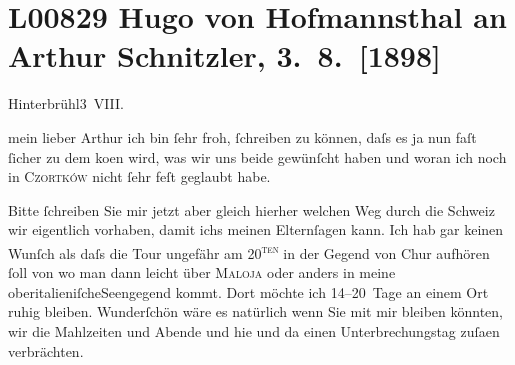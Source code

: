 

\section[Hugo von Hofmannsthal an Arthur Schnitzler, 3. 8. {[}1898{]}]{L00829 Hugo von Hofmannsthal an Arthur Schnitzler, 3. 8. {[}1898{]}}
\nopagebreak{}
\rehead{ }\normalsize\beginnumbering{}
\toendnotes[C]{\smallbreak\pagebreak[2]}
\toendnotes[C]{\smallbreak}
\pstart
           \raggedleft{}{\pb}Hinterbrühl3 VIII.\pend
           
\pstart{}mein lieber Arthur\pend\vspace{0.5em}
\pstart
           ich bin ſehr froh, ſchreiben zu können, daſs es ja nun faſt ſicher zu dem ko{\geminationm}en wird, was wir uns beide gewünſcht haben und woran
               ich noch in \textsc{Czortków} nicht ſehr feſt geglaubt habe.\pend
           
\pstart
           Bitte ſchreiben Sie mir jetzt {\pb}aber gleich hierher welchen Weg durch die Schweiz wir eigentlich vorhaben, damit ichs meinen Elternſagen kann. Ich hab gar keinen Wunſch als daſs die
               Tour ungefähr am 20\textsuperscript{\textsc{ten}} in der Gegend von Chur aufhören ſoll von
               wo man dann leicht über \textsc{Maloja} oder anders {\pb}in meine oberitalieniſcheSeengegend kommt. Dort möchte ich 14–20 Tage an
               einem Ort ruhig bleiben. Wunderſchön wäre es natürlich wenn Sie mit mir bleiben
               könnten, wir die Mahlzeiten und Abende und hie und da einen Unterbrechungstag {\pb}zuſa{\geminationm}en verbrächten.\pend
           

